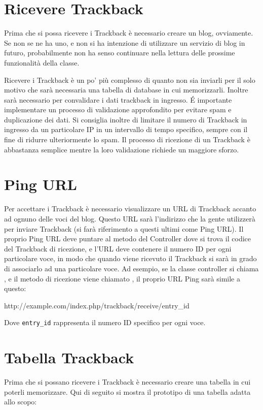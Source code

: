 
\section*{Ricevere Trackback}
Prima che si possa ricevere i Trackback è necessario creare un blog, ovviamente. Se non se ne ha uno, e non si ha intenzione di utilizzare un servizio di blog in futuro, probabilmente non ha senso continuare nella lettura delle prossime funzionalità della classe.

Ricevere i Trackback è un po' più complesso di quanto non sia inviarli per il solo motivo che sarà necessaria una tabella di database in cui memorizzarli. Inoltre sarà necessario per convalidare i dati trackback in ingresso. \'E importante implementare un processo di validazione approfondito per evitare spam e duplicazione dei dati. Si consiglia inoltre di limitare il numero di Trackback in ingresso da un particolare IP in un intervallo di tempo specifico, sempre con il fine di ridurre ulteriormente lo spam. Il processo di ricezione di un Trackback è abbastanza semplice mentre la loro validazione richiede un maggiore sforzo.

\section*{Ping URL}
Per accettare i Trackback è necessario visualizzare un \ac{URL} di Trackback accanto ad ognuno delle voci del blog. Questo \ac{URL} sarà l'indirizzo che la gente utilizzerà per inviare Trackback (si farà riferimento a questi ultimi come Ping URL). Il proprio Ping URL deve puntare al metodo del Controller dove si trova il codice del Trackback di ricezione, e l'URL deve contenere il numero ID per ogni particolare voce, in modo che quando viene ricevuto il Trackback si sarà in grado di associarlo ad una particolare voce. Ad esempio, se la classe controller si chiama , e il metodo di ricezione viene chiamato , il proprio URL Ping sarà simile a questo:

\begin{code}
http://example.com/index.php/trackback/receive/entry_id
\end{code}

Dove \verb|entry_id| rappresenta il numero ID specifico per ogni voce.

\section*{Tabella Trackback}
Prima che si possano ricevere i Trackback è necessario creare una tabella in cui poterli memorizzare. Qui di seguito si mostra il prototipo di una tabella adatta allo scopo:

